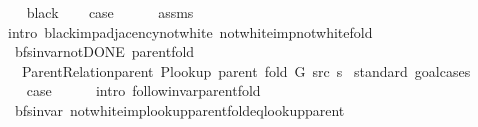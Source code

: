 \begin{isabellebody}
\isamarkupfalse%
\isanewline
\ \ \isamarkupfalse%
\ black\isanewline
\ \ \isamarkupfalse%
\ {\isacharquery}{\kern0pt}case\isanewline
\ \ \ \ \isamarkupfalse%
\ assms{\isacharparenleft}{\kern0pt}{}{\isacharparenright}{\kern0pt}\isanewline
\ \ \ \ \isamarkupfalse%
\ {\isacharparenleft}{\kern0pt}intro\ black{\isacharunderscore}{\kern0pt}imp{\isacharunderscore}{\kern0pt}adjacency{\isacharunderscore}{\kern0pt}not{\isacharunderscore}{\kern0pt}white\ not{\isacharunderscore}{\kern0pt}white{\isacharunderscore}{\kern0pt}imp{\isacharunderscore}{\kern0pt}not{\isacharunderscore}{\kern0pt}white{\isacharunderscore}{\kern0pt}fold{\isacharparenright}{\kern0pt}\isanewline
{}\isamarkupfalse%
%
\endisatagproof
{\isafoldproof}%
%
\isadelimproof
\isanewline
%
\endisadelimproof
%
\isadeliminvisible
\isanewline
%
\endisadeliminvisible
%
\isataginvisible
{}\isamarkupfalse%
\ {\isacharparenleft}{\kern0pt}\ bfs{\isacharunderscore}{\kern0pt}invar{\isacharunderscore}{\kern0pt}not{\isacharunderscore}{\kern0pt}DONE{\isacharparenright}{\kern0pt}\ parent{\isacharunderscore}{\kern0pt}fold{\isacharcolon}{\kern0pt}\isanewline
\ \ \ {\isachardoublequoteopen}Parent{\isacharunderscore}{\kern0pt}Relation{\isachardot}{\kern0pt}parent\ {\isacharparenleft}{\kern0pt}P{\isacharunderscore}{\kern0pt}lookup\ {\isacharparenleft}{\kern0pt}parent\ {\isacharparenleft}{\kern0pt}fold\ G\ src\ s{\isacharparenright}{\kern0pt}{\isacharparenright}{\kern0pt}{\isacharparenright}{\kern0pt}{\isachardoublequoteclose}%
\endisataginvisible
{\isafoldinvisible}%
%
\isadeliminvisible
\isanewline
%
\endisadeliminvisible
%
\isadelimproof
%
\endisadelimproof
%
\isatagproof
{}\isamarkupfalse%
\ {\isacharparenleft}{\kern0pt}standard{\isacharcomma}{\kern0pt}\ goal{\isacharunderscore}{\kern0pt}cases{\isacharparenright}{\kern0pt}\isanewline
\ \ \isamarkupfalse%
\ {}\isanewline
\ \ \isamarkupfalse%
\ {\isacharquery}{\kern0pt}case\isanewline
\ \ \ \ \isamarkupfalse%
\ {\isacharparenleft}{\kern0pt}intro\ follow{\isacharunderscore}{\kern0pt}invar{\isacharunderscore}{\kern0pt}parent{\isacharunderscore}{\kern0pt}fold{\isacharparenright}{\kern0pt}\isanewline
{}\isamarkupfalse%
%
\endisatagproof
{\isafoldproof}%
%
\isadelimproof
\isanewline
%
\endisadelimproof
\isanewline
{}\isamarkupfalse%
\ {\isacharparenleft}{\kern0pt}\ bfs{\isacharunderscore}{\kern0pt}invar{\isacharparenright}{\kern0pt}\ not{\isacharunderscore}{\kern0pt}white{\isacharunderscore}{\kern0pt}imp{\isacharunderscore}{\kern0pt}lookup{\isacharunderscore}{\kern0pt}parent{\isacharunderscore}{\kern0pt}fold{\isacharunderscore}{\kern0pt}eq{\isacharunderscore}{\kern0pt}lookup{\isacharunderscore}{\kern0pt}parent{\isacharcolon}{\kern0pt}\isanewline

\end{isabellebody}
